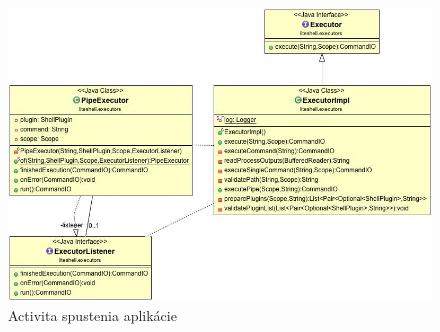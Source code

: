 \begin{figure}[!htbp]
	\centering
	\includegraphics[width=\linewidth]{img/executor.jpg}
	\caption{Activita spustenia aplikácie}
	\label{fig:test}
\end{figure}